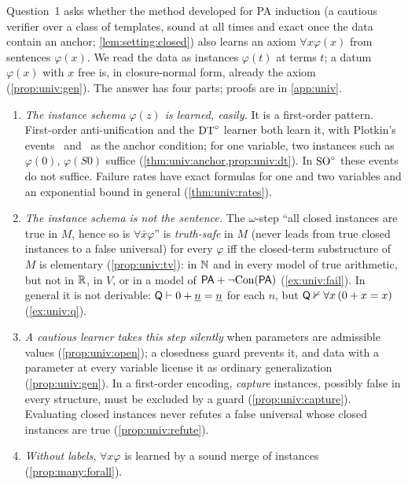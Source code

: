 Question~1 asks whether the method developed for PA induction (a cautious verifier over a class of templates, sound at all times and exact once the data contain an anchor; \cref{lem:setting:closed}) also learns an axiom $\forall x\varphi(x)$ from sentences $\varphi(x)$. We read the data as instances $\varphi(t)$ at terms $t$; a datum $\varphi(x)$ with $x$ free is, in closure-normal form, already the axiom (\cref{prop:univ:gen}). The answer has four parts; proofs are in \cref{app:univ}.
\begin{enumerate}[label=(\arabic*)]
\item \emph{The instance schema $\varphi(z)$ is learned, easily.} It is a first-order pattern. First-order anti-unification and the $\mathrm{DT}^{\circ}$ learner both learn it, with Plotkin's events \evR\ and \evD\ as the anchor condition; for one variable, two instances such as $\varphi(0)$, $\varphi(S0)$ suffice (\cref{thm:univ:anchor,prop:univ:dt}). In $\mathrm{SO}^{\circ}$ these events do not suffice. Failure rates have exact formulas for one and two variables and an exponential bound in general (\cref{thm:univ:rates}).
\item \emph{The instance schema is not the sentence.} The $\omega$-step ``all closed instances are true in $M$, hence so is $\forall\bar x\varphi$'' is \emph{truth-safe} in $M$ (never leads from true closed instances to a false universal) for every $\varphi$ iff the closed-term substructure of $M$ is elementary (\cref{prop:univ:tv}): in $\mathbb{N}$ and in every model of true arithmetic, but not in $\mathbb{R}$, in $V$, or in a model of $\mathsf{PA}+\neg\mathrm{Con}(\mathsf{PA})$ (\cref{ex:univ:fail}). In general it is not derivable: $\mathsf{Q}\vdash0+\underline{n}=\underline{n}$ for each $n$, but $\mathsf{Q}\nvdash\forall x\,(0+x=x)$ (\cref{ex:univ:q}).
\item \emph{A cautious learner takes this step silently} when parameters are admissible values (\cref{prop:univ:open}); a closedness guard prevents it, and data with a parameter at every variable license it as ordinary generalization (\cref{prop:univ:gen}). In a first-order encoding, \emph{capture} instances, possibly false in every structure, must be excluded by a guard (\cref{prop:univ:capture}). Evaluating closed instances never refutes a false universal whose closed instances are true (\cref{prop:univ:refute}).
\item \emph{Without labels}, $\forall x\varphi$ is learned by a sound merge of instances (\cref{prop:many:forall}).
\end{enumerate}

